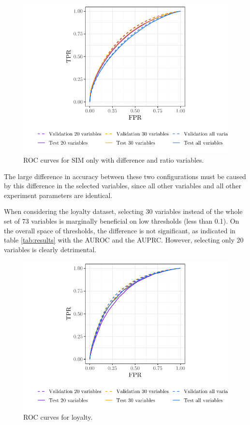 \begin{figure}
    \centering
    \includegraphics[width=0.9\linewidth]{figures/roc_simo_diff.pdf}
    \caption{ROC curves for SIM only with difference and ratio variables.}
    \label{fig:roc_simo_diff}
\end{figure}

The large difference in accuracy between these two configurations must be caused
by this difference in the selected variables, since all other variables and all
other experiment parameters are identical.

When considering the loyalty dataset, selecting 30 variables instead of the
whole set of 73 variables is marginally beneficial on low thresholds (less than
0.1). On the overall space of thresholds, the difference is not significant, as
indicated in table \ref{tab:results} with the AUROC and the AUPRC. However,
selecting only 20 variables is clearly detrimental.

\begin{figure}
    \centering
    \includegraphics[width=0.9\linewidth]{figures/roc_loy.pdf}
    \caption{ROC curves for loyalty.}
    \label{fig:roc_loy}
\end{figure}

